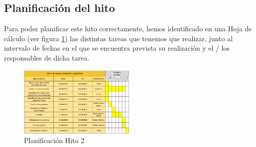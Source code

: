 \subsection{Planificación del hito}
Para poder planificar este hito correctamente, hemos identificado en una Hoja de cálculo (ver figura \ref{fig:planif-hito2}) las distintas tareas que tenemos que 
realizar, junto al intervalo de fechas en el que se encuentra prevista su realización y el / los responsables de dicha tarea.

\begin{figure}[H]
    \centering 
    \includegraphics[width=0.5\textwidth]{./Imagenes/Planificaciones/Planif-hito2.png}
    \caption{Planificación Hito 2}
    \label{fig:planif-hito2}
\end{figure}

